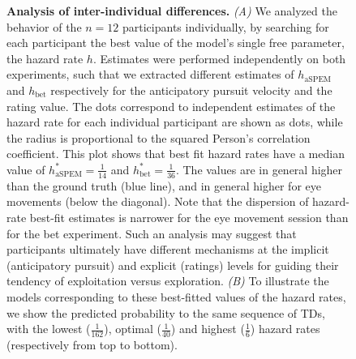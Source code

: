 \documentclass[10pt,letterpaper]{article}
\begin{document}
\begin{figure}%

\caption{\textbf{Analysis of inter-individual differences.} %
\textit{(A)}
We analyzed the behavior of the $n=12$ participants individually, by searching for each participant
the best value of the model's single free parameter, the hazard rate $h$.
Estimates were performed independently on both experiments,
such that we extracted different estimates of $h_{\text{aSPEM}}$ and $h_{\text{bet}}$
respectively for the anticipatory pursuit velocity and the rating value.
The dots correspond to independent estimates of the hazard rate
for each individual participant are shown as dots,
while the radius is proportional to the squared Person's correlation coefficient.
This plot shows that best fit hazard rates have a median value of  $h^{*}_{\text{aSPEM}}=\frac{1}{14}$ and $h^{*}_{\text{bet}}=\frac{1}{36}$.
The values are in general higher than the ground truth (blue line),
and in general higher for eye movements (below the diagonal).
Note that the dispersion of hazard-rate best-fit estimates is narrower
for the eye movement session than for the bet experiment.
Such an analysis may suggest that participants ultimately have
different mechanisms at the implicit (anticipatory pursuit) and explicit (ratings) levels
for guiding their tendency of exploitation versus exploration.
\textit{(B)} To illustrate the models corresponding to these best-fitted values of the hazard rates,
we show the predicted probability to the same sequence of TDs,
with the lowest ($\frac{1}{162}$), optimal ($\frac{1}{40}$) and highest ($\frac{1}{6}$) hazard rates
(respectively from top to bottom).
}
\label{fig:results_inter}
\end{figure}
\end{document}
